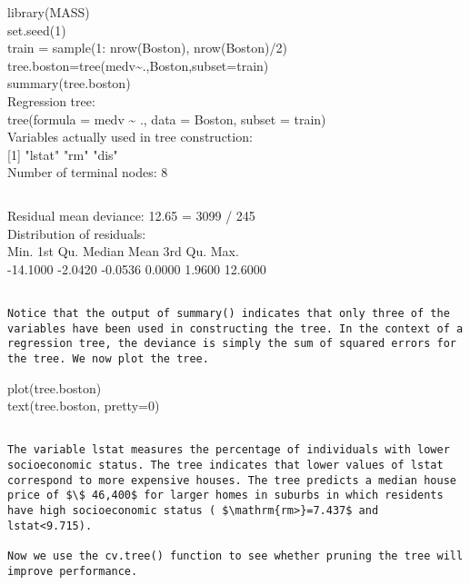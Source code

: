 \documentclass[10pt]{article}
\begin{document}
\begin{displayquote}
library(MASS)\\
set.seed(1)\\
train = sample(1: nrow(Boston), nrow(Boston)/2)\\
tree.boston=tree(medv\~{}.,Boston,subset=train)\\
summary(tree.boston)\\
Regression tree:\\
tree(formula = medv \~{} ., data = Boston, subset = train)\\
Variables actually used in tree construction:\\[0pt]
[1] "lstat" "rm" "dis"\\
Number of terminal nodes: 8
\end{displayquote}

\begin{verbatim}

\end{verbatim}

Residual mean deviance: 12.65 = 3099 / 245\\
Distribution of residuals:\\
Min. 1st Qu. Median Mean 3rd Qu. Max.\\
-14.1000 -2.0420 -0.0536 0.0000 1.9600 12.6000

\begin{verbatim}

Notice that the output of summary() indicates that only three of the variables have been used in constructing the tree. In the context of a regression tree, the deviance is simply the sum of squared errors for the tree. We now plot the tree.
\end{verbatim}

\begin{displayquote}
plot(tree.boston)\\
text(tree.boston, pretty=0)
\end{displayquote}

\begin{verbatim}

The variable lstat measures the percentage of individuals with lower socioeconomic status. The tree indicates that lower values of lstat correspond to more expensive houses. The tree predicts a median house price of $\$ 46,400$ for larger homes in suburbs in which residents have high socioeconomic status ( $\mathrm{rm>}=7.437$ and lstat<9.715).

Now we use the cv.tree() function to see whether pruning the tree will improve performance.
\end{verbatim}
\end{document}
